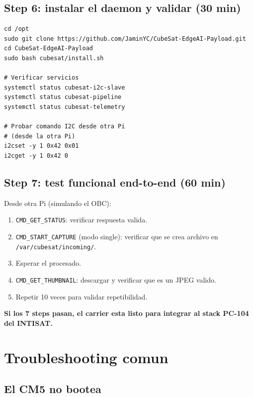 \documentclass[11pt,a4paper,oneside,openright]{book}
\begin{document}
\section{Step 6: instalar el daemon y validar (30 min)}

\begin{lstlisting}
cd /opt
sudo git clone https://github.com/JaminYC/CubeSat-EdgeAI-Payload.git
cd CubeSat-EdgeAI-Payload
sudo bash cubesat/install.sh

# Verificar servicios
systemctl status cubesat-i2c-slave
systemctl status cubesat-pipeline
systemctl status cubesat-telemetry

# Probar comando I2C desde otra Pi
# (desde la otra Pi)
i2cset -y 1 0x42 0x01
i2cget -y 1 0x42 0
\end{lstlisting}

\section{Step 7: test funcional end-to-end (60 min)}

Desde otra Pi (simulando el OBC):

\begin{enumerate}[leftmargin=2em]
  \item \texttt{CMD\_GET\_STATUS}: verificar respuesta valida.
  \item \texttt{CMD\_START\_CAPTURE} (modo single): verificar que se crea
        archivo en \texttt{/var/cubesat/incoming/}.
  \item Esperar el procesado.
  \item \texttt{CMD\_GET\_THUMBNAIL}: descargar y verificar que es un
        JPEG valido.
  \item Repetir 10 veces para validar repetibilidad.
\end{enumerate}

\textbf{Si los 7 steps pasan, el carrier esta listo para integrar al stack
PC-104 del INTISAT.}

\chapter{Troubleshooting comun}
\label{ch:troubleshooting}

\section{El CM5 no bootea}
\end{document}
